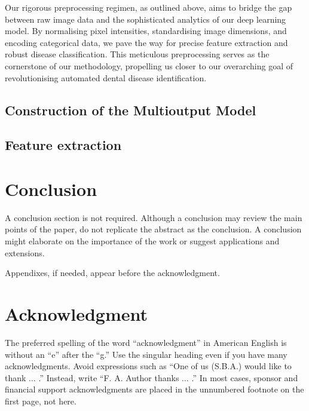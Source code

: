 \documentclass[journal,twoside,web]{ieeecolor}
\begin{document}
Our rigorous preprocessing regimen, as outlined above, aims to bridge the gap between raw image data and the sophisticated analytics of our deep learning model. By normalising pixel intensities, standardising image dimensions, and encoding categorical data, we pave the way for precise feature extraction and robust disease classification. This meticulous preprocessing serves as the cornerstone of our methodology, propelling us closer to our overarching goal of revolutionising automated dental disease identification.


\subsection{Construction of the Multioutput Model}

\subsection{Feature extraction}



\section{Conclusion}
A conclusion section is not required. Although a conclusion may review the 
main points of the paper, do not replicate the abstract as the conclusion. A 
conclusion might elaborate on the importance of the work or suggest 
applications and extensions. 

\appendices

Appendixes, if needed, appear before the acknowledgment.

\section*{Acknowledgment}

The preferred spelling of the word ``acknowledgment'' in American English is 
without an ``e'' after the ``g.'' Use the singular heading even if you have 
many acknowledgments. Avoid expressions such as ``One of us (S.B.A.) would 
like to thank $\ldots$ .'' Instead, write ``F. A. Author thanks $\ldots$ .'' In most 
cases, sponsor and financial support acknowledgments are placed in the 
unnumbered footnote on the first page, not here.
\end{document}
